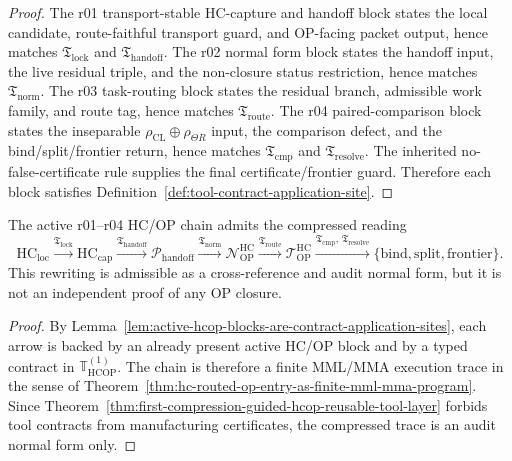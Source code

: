 \begin{proof}
The r01 transport-stable HC-capture and handoff block states the local candidate, route-faithful transport guard, and OP-facing packet output, hence matches \(\mathfrak T_{\mathrm{lock}}\) and \(\mathfrak T_{\mathrm{handoff}}\). The r02 normal form block states the handoff input, the live residual triple, and the non-closure status restriction, hence matches \(\mathfrak T_{\mathrm{norm}}\). The r03 task-routing block states the residual branch, admissible work family, and route tag, hence matches \(\mathfrak T_{\mathrm{route}}\). The r04 paired-comparison block states the inseparable \(\rho_{\mathrm{CL}}\oplus\rho_{\Theta R}\) input, the comparison defect, and the bind/split/frontier return, hence matches \(\mathfrak T_{\mathrm{cmp}}\) and \(\mathfrak T_{\mathrm{resolve}}\). The inherited no-false-certificate rule supplies the final certificate/frontier guard. Therefore each block satisfies Definition~\ref{def:tool-contract-application-site}.
\end{proof}

\begin{proposition}
\label{prop:tool-indexed-rewriting-active-hcop-chain}
The active r01--r04 HC/OP chain admits the compressed reading
\[
  \mathrm{HC}_{\mathrm{loc}}
  \xrightarrow{\mathfrak T_{\mathrm{lock}}}
  \mathrm{HC}_{\mathrm{cap}}
  \xrightarrow{\mathfrak T_{\mathrm{handoff}}}
  \mathcal P_{\mathrm{handoff}}
  \xrightarrow{\mathfrak T_{\mathrm{norm}}}
  \mathcal N_{\mathrm{OP}}^{\mathrm{HC}}
  \xrightarrow{\mathfrak T_{\mathrm{route}}}
  \mathcal T_{\mathrm{OP}}^{\mathrm{HC}}
  \xrightarrow{\mathfrak T_{\mathrm{cmp}},\,\mathfrak T_{\mathrm{resolve}}}
  \{\mathrm{bind},\mathrm{split},\mathrm{frontier}\}.
\]
This rewriting is admissible as a cross-reference and audit normal form, but it is not an independent proof of any OP closure.
\end{proposition}

\begin{proof}
By Lemma~\ref{lem:active-hcop-blocks-are-contract-application-sites}, each arrow is backed by an already present active HC/OP block and by a typed contract in \(\mathbb T_{\mathrm{HCOP}}^{(1)}\). The chain is therefore a finite MML/MMA execution trace in the sense of Theorem~\ref{thm:hc-routed-op-entry-as-finite-mml-mma-program}. Since Theorem~\ref{thm:first-compression-guided-hcop-reusable-tool-layer} forbids tool contracts from manufacturing certificates, the compressed trace is an audit normal form only.
\end{proof}

